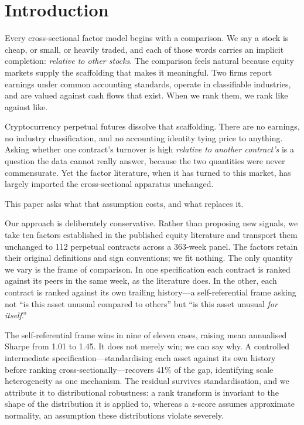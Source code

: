 \documentclass[11pt,letterpaper]{article}
\begin{document}
\thispagestyle{empty}
\newpage
\setcounter{page}{1}

\section{Introduction}

Every cross-sectional factor model begins with a comparison. We say a stock is
cheap, or small, or heavily traded, and each of those words carries an implicit
completion: \emph{relative to other stocks}. The comparison feels natural
because equity markets supply the scaffolding that makes it meaningful. Two
firms report earnings under common accounting standards, operate in classifiable
industries, and are valued against cash flows that exist. When we rank them, we
rank like against like.

Cryptocurrency perpetual futures dissolve that scaffolding. There are no
earnings, no industry classification, and no accounting identity tying price to
anything. Asking whether one contract's turnover is high \emph{relative to
another contract's} is a question the data cannot really answer, because the two
quantities were never commensurate. Yet the factor literature, when it has
turned to this market, has largely imported the cross-sectional apparatus
unchanged.

This paper asks what that assumption costs, and what replaces it.

Our approach is deliberately conservative. Rather than proposing new signals, we
take ten factors established in the published equity literature and transport
them unchanged to 112 perpetual contracts across a 363-week panel. The factors
retain their original definitions and sign conventions; we fit nothing. The only
quantity we vary is the frame of comparison. In one specification each contract
is ranked against its peers in the same week, as the literature does. In the
other, each contract is ranked against its own trailing history---a
self-referential frame asking not ``is this asset unusual compared to others''
but ``is this asset unusual \emph{for itself}.''

The self-referential frame wins in nine of eleven cases, raising mean annualised
Sharpe from 1.01 to 1.45. It does not merely win; we can say why. A controlled
intermediate specification---standardising each asset against its own history
before ranking cross-sectionally---recovers 41\% of the gap, identifying scale
heterogeneity as one mechanism. The residual survives standardisation, and we
attribute it to distributional robustness: a rank transform is invariant to the
shape of the distribution it is applied to, whereas a $z$-score assumes
approximate normality, an assumption these distributions violate severely.
\end{document}
